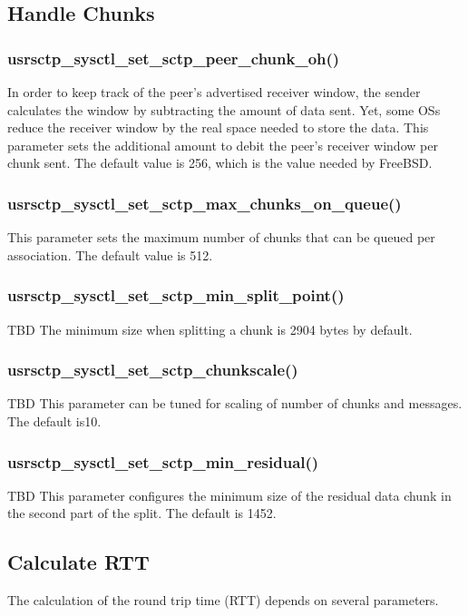 \documentclass[a4paper]{article}
\begin{document}
\subsection{Handle Chunks}
\subsubsection{usrsctp\_sysctl\_set\_sctp\_peer\_chunk\_oh()}
In order to keep track of the peer's advertised receiver window, the sender calculates the window by
subtracting the amount of data sent. Yet, some OSs reduce the receiver window by the real space needed
to store the data. This parameter sets the additional amount to debit the peer's receiver window per
chunk sent. The default value is 256, which is the value needed by FreeBSD.

\subsubsection{usrsctp\_sysctl\_set\_sctp\_max\_chunks\_on\_queue()}
This parameter sets the maximum number of chunks that can be queued per association. The default 
value is 512.

\subsubsection{usrsctp\_sysctl\_set\_sctp\_min\_split\_point()}
TBD
The minimum size when splitting a chunk is 2904 bytes by default.

\subsubsection{usrsctp\_sysctl\_set\_sctp\_chunkscale()}
TBD
This parameter can be tuned for scaling of number of chunks and messages. The default is10.		
				
\subsubsection{usrsctp\_sysctl\_set\_sctp\_min\_residual()}
TBD
This parameter configures the minimum size of the residual data chunk in the second
part of the split. The default is 1452.


\subsection{Calculate RTT}
The calculation of the round trip time (RTT) depends on several parameters.
\end{document}

